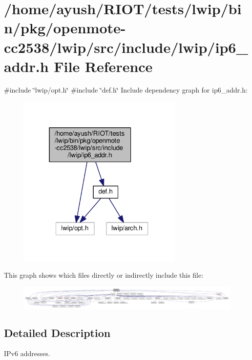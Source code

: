 \hypertarget{openmote-cc2538_2lwip_2src_2include_2lwip_2ip6__addr_8h}{}\section{/home/ayush/\+R\+I\+O\+T/tests/lwip/bin/pkg/openmote-\/cc2538/lwip/src/include/lwip/ip6\+\_\+addr.h File Reference}
\label{openmote-cc2538_2lwip_2src_2include_2lwip_2ip6__addr_8h}
{\ttfamily \#include \char`\"{}lwip/opt.\+h\char`\"{}}\newline
{\ttfamily \#include \char`\"{}def.\+h\char`\"{}}\newline
Include dependency graph for ip6\+\_\+addr.\+h\+:
\nopagebreak
\begin{figure}[H]
\begin{center}
\leavevmode
\includegraphics[width=232pt]{openmote-cc2538_2lwip_2src_2include_2lwip_2ip6__addr_8h__incl}
\end{center}
\end{figure}
This graph shows which files directly or indirectly include this file\+:
\nopagebreak
\begin{figure}[H]
\begin{center}
\leavevmode
\includegraphics[width=350pt]{openmote-cc2538_2lwip_2src_2include_2lwip_2ip6__addr_8h__dep__incl}
\end{center}
\end{figure}


\subsection{Detailed Description}
I\+Pv6 addresses. 